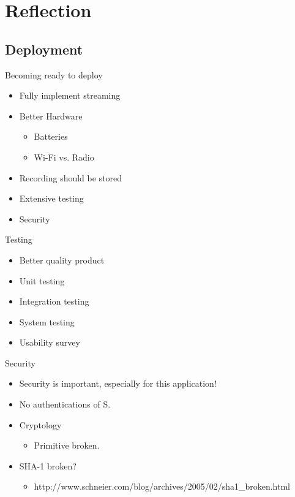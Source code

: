 

\author{Rasmus Steiniche}
\section{Reflection}

\subsection{Deployment}
\begin{frame}{Becoming ready to deploy}
\begin{itemize}
	\item Fully implement streaming
	\item Better Hardware
	\begin{itemize}
		\item Batteries
		\item Wi-Fi vs. Radio
	\end{itemize}
	\item Recording should be stored
	\item Extensive testing
	\item Security
\end{itemize}
\end{frame}

\begin{frame}{Testing}
\begin{itemize}
	\item Better quality product
	\item Unit testing
	\item Integration testing
	\item System testing
	\item Usability survey
\end{itemize}
\end{frame}

\begin{frame}{Security}
\begin{itemize}
	\item Security is important, especially for this application!
	\item No authentications of S.
	\item Cryptology
	\begin{itemize}
		\item Primitive broken.
	\end{itemize}
	\item SHA-1 broken?
	\begin{itemize}
		\item \tiny{http://www.schneier.com/blog/archives/2005/02/sha1\_broken.html}
	\end{itemize}
\end{itemize}
\end{frame}


